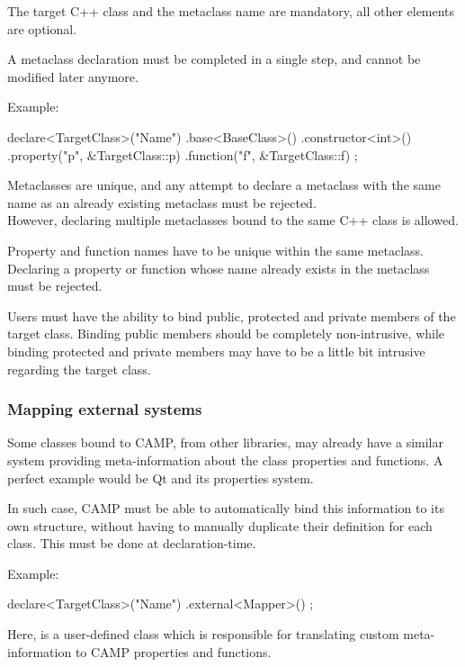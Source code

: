 \documentclass[a4paper, twoside]{report}
\begin{document}
	The target C++ class and the metaclass name are mandatory, all other elements are optional.
	
	A metaclass declaration must be completed in a single step, and cannot be modified later anymore.
	
	Example:

\begin{cppcode}
declare<TargetClass>("Name")
  .base<BaseClass>()
  .constructor<int>()
  .property("p", &TargetClass::p)
  .function("f", &TargetClass::f)
  ;
\end{cppcode}

	\ibwarning
	{
			Metaclasses are unique, and any attempt to declare a metaclass with the same name
			as an already existing metaclass must be rejected. \\
			However, declaring multiple metaclasses bound to the same C++ class is allowed.
	}
	
	\ibwarning
	{
		Property and function names have to be unique within the same metaclass. Declaring a property
		or function whose name already exists in the metaclass must be rejected.
	}

	Users must have the ability to bind public, protected and private members of the target class.
	Binding public members should be completely non-intrusive, while binding protected and private members
	may have to be a little bit intrusive regarding the target class.

\subsubsection{Mapping external systems}

	Some classes bound to CAMP, from other libraries, may already have a similar system
	providing meta-information about the class properties and functions. A perfect example
	would be Qt and its properties system.

	In such case, CAMP must be able to automatically bind this information to its own structure,
	without having to manually duplicate their definition for each class. This must be done at
	declaration-time.
	
	Example:

\begin{cppcode}
declare<TargetClass>("Name")
  .external<Mapper>()
  ;
\end{cppcode}
	
	Here, \verb@Mapper@ is a user-defined class which is responsible for
	translating custom meta-information to CAMP properties and functions.
\end{document}
